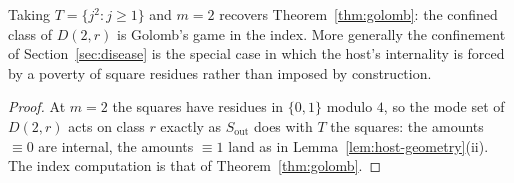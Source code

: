 \begin{corollary}\label{cor:sec7-recovered}
Taking $T = \{j^2 : j \ge 1\}$ and $m = 2$ recovers
Theorem~\ref{thm:golomb}: the confined class of $D(2,r)$ is Golomb's game
in the index. More generally the confinement of
Section~\ref{sec:disease} is the special case in which the host's
internality is forced by a poverty of square residues rather than imposed
by construction.
\end{corollary}
\begin{proof}
At $m = 2$ the squares have residues in $\{0, 1\}$ modulo $4$, so the
mode set of $D(2,r)$ acts on class $r$ exactly as $S_{\mathrm{out}}$ does
with $T$ the squares: the amounts $\equiv 0$ are internal, the amounts
$\equiv 1$ land as in Lemma~\ref{lem:host-geometry}(ii). The index
computation is that of Theorem~\ref{thm:golomb}.
\end{proof}


